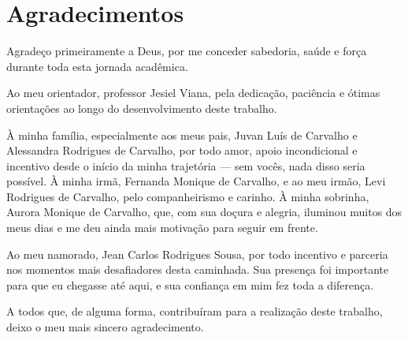 \chapter*{Agradecimentos}

Agradeço primeiramente a Deus, por me conceder sabedoria, saúde e força durante toda esta jornada acadêmica.

Ao meu orientador, professor Jesiel Viana, pela dedicação, paciência e ótimas orientações ao longo do desenvolvimento deste trabalho.

À minha família, especialmente aos meus pais, Juvan Luís de Carvalho e Alessandra Rodrigues de Carvalho, por todo amor, apoio incondicional e incentivo desde o início da minha trajetória — sem vocês, nada disso seria possível. À minha irmã, Fernanda Monique de Carvalho, e ao meu irmão, Levi Rodrigues de Carvalho, pelo companheirismo e carinho. À minha sobrinha, Aurora Monique de Carvalho, que, com sua doçura e alegria, iluminou muitos dos meus dias e me deu ainda mais motivação para seguir em frente.

Ao meu namorado, Jean Carlos Rodrigues Sousa, por todo incentivo e parceria nos momentos mais desafiadores desta caminhada. Sua presença foi importante para que eu chegasse até aqui, e sua confiança em mim fez toda a diferença.

A todos que, de alguma forma, contribuíram para a realização deste trabalho, deixo o meu mais sincero agradecimento.
